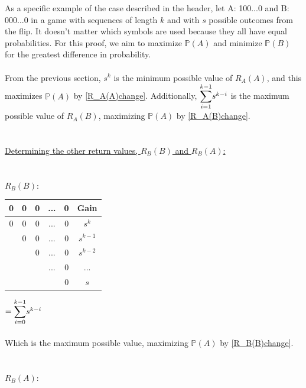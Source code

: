 \documentclass[english,12pt,a4paper,final]{article}
\begin{document}
As a specific example of the case described in the header, let A: 100...0 and B: 000...0 in a game with sequences of length $k$ and with $s$ possible outcomes from the flip. It doesn't matter which symbols are used because they all have equal probabilities. For this proof, we aim to maximize $\mathbb{P}(A)$ and minimize $\mathbb{P}(B)$ for the greatest difference in probability.
\\\\
From the previous section, $s^k$ is the minimum possible value of $R_A(A)$, and this maximizes $\mathbb{P}(A)$ by \eqref{R_A(A)change}. Additionally, $\mathlarger\sum_{i=1}^{k-1}s^{k-i}$ is the maximum possible value of $R_A(B)$, maximizing $\mathbb{P}(A)$ by \eqref{R_A(B)change}.
\\\\\\
\underline{Determining the other return values, $R_B(B)$ and $R_B(A)$:}
\\\\\\
${R_B(B)}$:
\begin{tabular}{|ccccc|c|}
	\hline
	0 & 0 & 0 & ... & 0 & Gain \\
	\hline
	
	\textcolor{OliveGreen}{0} & \textcolor{OliveGreen}{0} & \textcolor{OliveGreen}{0} & \textcolor{OliveGreen}{...} & \textcolor{OliveGreen}{0} & $s^k$\\
	
	& \textcolor{OliveGreen}{0} & \textcolor{OliveGreen}{0} & \textcolor{OliveGreen}{...} & \textcolor{OliveGreen}{0} & $s^{k-1}$\\
	
	&  & \textcolor{OliveGreen}{0} & \textcolor{OliveGreen}{...} & \textcolor{OliveGreen}{0} & $s^{k-2}$ \\
	
	&  &  & \textcolor{OliveGreen}{...} & \textcolor{OliveGreen}{0} & ... \\
	
	&  &  &  & \textcolor{OliveGreen}{0} & $s$ \\
	\hline
\end{tabular}
$=\mathlarger\sum_{i=0}^{k-1}s^{k-i}$
\\\\
Which is the maximum possible value, maximizing $\mathbb{P}(A)$ by \eqref{R_B(B)change}.
\\\\\\
${R_B(A)}$:
\end{document}
